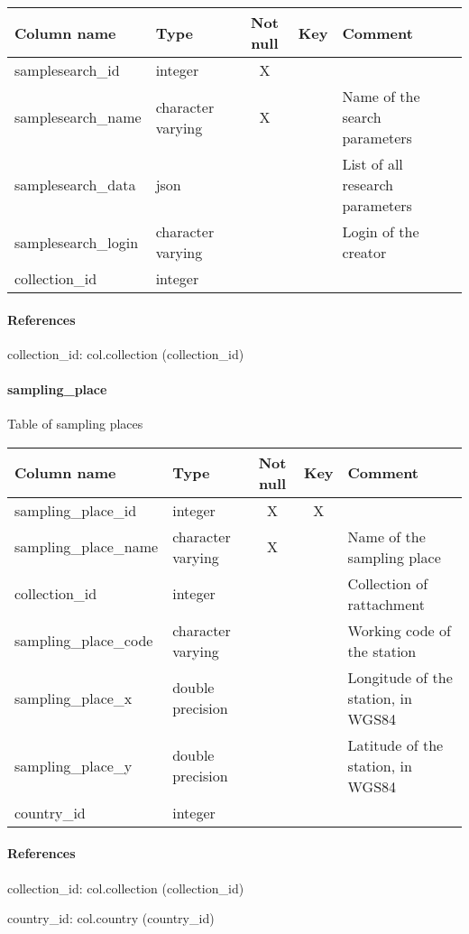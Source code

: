 \begin{tabular}{|l| p{2cm}|c|c| p{5cm}|}
\hline
Column name & Type & Not null & Key & Comment \\
\hline
samplesearch\_id & integer & X &  & \\
samplesearch\_name & character varying & X &  & Name of the search parameters\\
samplesearch\_data & json &  &  & List of all research parameters\\
samplesearch\_login & character varying &  &  & Login of the creator\\
collection\_id & integer &  &  & \\
\hline
\end{tabular}
\paragraph{References}
collection\_id: col.collection (collection\_id)

\paragraph{sampling\_place}
Table of sampling places

\begin{tabular}{|l| p{2cm}|c|c| p{5cm}|}
\hline
Column name & Type & Not null & Key & Comment \\
\hline
sampling\_place\_id & integer & X & X & \\
sampling\_place\_name & character varying & X &  & Name of the sampling place\\
collection\_id & integer &  &  & Collection of rattachment\\
sampling\_place\_code & character varying &  &  & Working code of the station\\
sampling\_place\_x & double precision &  &  & Longitude of the station, in WGS84\\
sampling\_place\_y & double precision &  &  & Latitude of the station, in WGS84\\
country\_id & integer &  &  & \\
\hline
\end{tabular}
\paragraph{References}
collection\_id: col.collection (collection\_id)

country\_id: col.country (country\_id)

